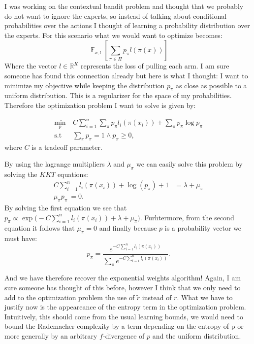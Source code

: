 \documentclass{amsart}
\DeclareMathOperator{\E}{\mathbb{E}}
\newcommand{\Rset}{\mathbb{R}}
\begin{document}
 I was working on the contextual bandit problem and thought that we
 probably do not want to ignore the experts, so instead of talking
 about conditional probabilities over the actions I thought of
 learning a probability distribution over the experts. For this
 scenario what we would want to optimize becomes:
 \begin{equation*}
   \E_{x,l}[\sum_{\pi \in \Pi} p_\pi l(\pi(x))]
 \end{equation*}
 Where the vector $l \in \Rset^K$ represents the loss of pulling each
 arm. I am sure someone has found this connection already but here is
 what I thought: I want to minimize my objective while keeping the
 distribution $p_\pi$ as close as possible to a uniform
 distribution. This is a regularizer for the space of my
 probabilities. Therefore the optimization problem I want to solve is
 given by:

 \begin{align}
   \min_p & \ C \sum_{i=1}^n \sum_\pi p_\pi l_i(\pi(x_i)) + \sum_\pi
   p_\pi \log p_\pi \\
 \text{s.t} & \  \sum_{\pi} p_\pi = 1 \wedge  p_\pi \geq 0,
 \end{align}
where $C$ is a tradeoff parameter. 

By using the lagrange multipliers $\lambda$ and $\mu_{\pi}$ we can easily
solve this problem by solving the $KKT$ equations:
\begin{align*}
  C \sum_{i=1}^n l_i(\pi(x_i)) + \log(p_\pi) + 1 &= \lambda +\mu_\pi \\
\mu_{\pi} p_\pi\ = 0.
\end{align*}
By solving the first equation we see that $p_\pi \propto \exp\Big(-C
\sum_{i=1}^n l_i(\pi(x_i)) + \lambda + \mu_\pi\Big)$. Furhtermore, from the
second equation it follows that $\mu_\pi = 0$ and finally because $p$
is a probability vector we must have:
\begin{equation*}
  p_\pi = \frac{e^{-C \sum_{i=1}^n l_i(\pi(x_i))}}{\sum_{\pi} e^{-C \sum_{i=1}^n l_i(\pi(x_i))}}.
\end{equation*}

And we have therefore recover the exponential weights algorithm!
Again, I am sure someone has thought of this before, however I think
that we only need to add to the optimization problem the use of
$\widetilde{r}$ instead of $r$. What we have to justify now is the
appeareance of the entropy term in the optimization
problem. Intuitively, this should come from the usual learning bounds,
we would need to bound the Rademacher complexity by a term depending
on the entropy of p or more generally by an
arbitrary $f$-divergence of $p$ and the uniform distribution. 
\end{document}

